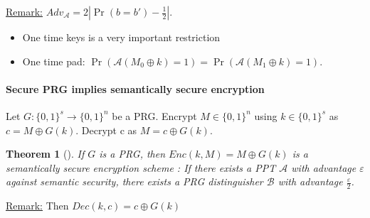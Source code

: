 \documentclass{article}
\newtheorem{thm}{Theorem}[section]
\newcommand{\Thm}[3]{\begin{thm}[#1]\label{#2}#3\end{thm}}
\newcommand{\Rem}{\underline{Remark:} }
\newcommand{\A}{\mathcal{A}}
\renewcommand{\epsilon}{\varepsilon}
\begin{document}
\begin{center}
\end{center}

\Rem $Adv_\A=2|\Pr(b=b')-\frac{1}{2}|$.
\begin{itemize}
\item One time keys is a very important restriction
\item One time pad: $\Pr(\A(M_0\oplus k)=1)=\Pr(\A(M_1\oplus k)=1)$.
\end{itemize}

\paragraph{Secure PRG implies semantically secure encryption}
Let $G:\{0,1\}^s\rightarrow\{0,1\}^n$ be a PRG. Encrypt $M\in\{0,1\}^n$ using $k\in\{0,1\}^s$ as $c=M\oplus G(k)$.
Decrypt c as $M=c\oplus G(k)$.

\Thm{}{thm:securePRGSemSecEncryt}{If $G$ is a PRG, then $Enc(k,M)=M\oplus G(k)$ is a semantically secure encryption scheme : If there exists a PPT $\A$ with advantage $\epsilon$ against semantic security, there exists a PRG distinguisher $\mathcal{B}$ with advantage $\frac{\epsilon}{2}$.}

\Rem Then $Dec(k,c)=c\oplus G(k)$
\end{document}
